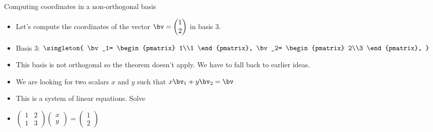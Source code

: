 \documentclass{beamer}
\begin{document}
\begin{frame}{Computing coordinates in a non-orthogonal basis}
\begin{itemize}
\item Let's compute the coordinates of the vector $\bv=\begin{pmatrix} 1\\2 \end{pmatrix}$ in basis 3.
\item Basis 3: $\singleton{
\bv_1=
\begin{pmatrix} 1\\1 \end{pmatrix},
\bv_2=
\begin{pmatrix} 2\\3 \end{pmatrix},
}$
\item This basis is not orthogonal so the theorem doesn't apply. We have to fall back to earlier ideas.
\item We are looking for two scalars $x$ and $y$ such that $x\bv_1+y\bv_2=\bv$
\item This is a system of linear equations. Solve
\item $
\begin{pmatrix}
1 & 2 \\
1 & 3
\end{pmatrix}
\begin{pmatrix}
x \\
y
\end{pmatrix}
=
\begin{pmatrix}
1 \\
2
\end{pmatrix}
$
\end{itemize}
\end{frame}
\end{document}
